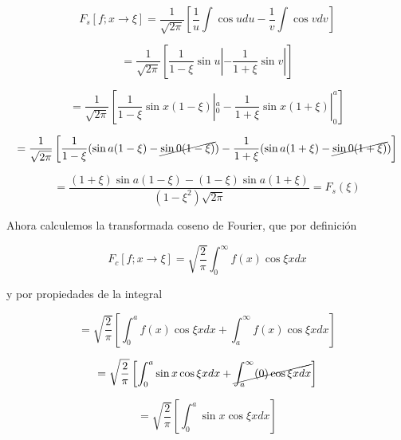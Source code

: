 \documentclass[12pt,a4paper]{article}
\begin{document}
\begin{enumerate}
    \begin{equation*}
        F_s[f;x \rightarrow \xi] =\frac{1}{\sqrt{2\pi}}\left[\frac{1}{u}\int\cos{u}  du -\frac{1}{v} \int \cos{v} dv \right]
    \end{equation*}
    
    \begin{equation*}
        = \frac{1}{\sqrt{2\pi}}\left[\frac{1}{1-\xi} \sin{u} | -\frac{1}{1+ \xi} \sin{v} | \right]
    \end{equation*}
    
    \begin{equation*}
        = \frac{1}{\sqrt{2\pi}}\left[\frac{1}{1- \xi} \sin{x(1-\xi)} |_{0}^{a} -\frac{1}{1+ \xi} \sin{x(1+\xi)} |_{0}^{a} \right]
    \end{equation*}
    
    \begin{equation*}
        = \frac{1}{\sqrt{2\pi}}\left[\frac{1}{1- \xi} (\sin{a(1-\xi)}-\cancel{\sin{0(1-\xi)}}) -\frac{1}{1+ \xi} (\sin{a(1+\xi)} - \cancel{\sin{0(1+\xi)}}) \right]
    \end{equation*}
    
    \begin{equation*}
        = \frac{(1+ \xi)\sin{a(1-\xi)}-(1-\xi)\sin{a(1+\xi)}}{(1-\xi^2)\sqrt{2\pi}}=F_s(\xi)
    \end{equation*}
    
    Ahora calculemos la transformada coseno de Fourier, que por definición
    
    \begin{equation*}
        F_c[f;x \rightarrow \xi] =\sqrt{\frac{2}{\pi}}\int_{0}^{\infty} f(x)\cos{\xi x} dx
    \end{equation*}
    
    y por propiedades de la integral
    
    
    \begin{equation*}
        = \sqrt{\frac{2}{\pi}}\left[\int_{0}^{a} f(x)\cos{\xi x} dx + \int_{a}^{\infty} f(x)\cos{\xi x} dx\right]
    \end{equation*}
    
    \begin{equation*}
        = \sqrt{\frac{2}{\pi}}\left[\int_{0}^{a} \sin{x}\cos{\xi x} dx + \cancel{\int_{a}^{\infty} (0)\cos{\xi x} dx}\right]
    \end{equation*}
    
    \begin{equation*}
        =\sqrt{\frac{2}{\pi}}\left[\int_{0}^{a} \sin{x}\cos{\xi x} dx\right]
    \end{equation*}
    

\end{enumerate}
\end{document}
